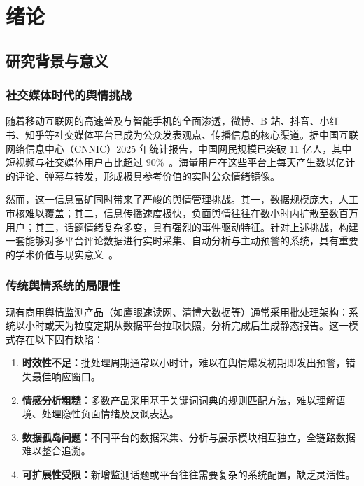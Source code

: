 
\chapter{绪论}

\section{研究背景与意义}

\subsection{社交媒体时代的舆情挑战}

随着移动互联网的高速普及与智能手机的全面渗透，微博、B 站、抖音、小红书、知乎等社交媒体平台已成为公众发表观点、传播信息的核心渠道。据中国互联网络信息中心（CNNIC）2025 年统计报告，中国网民规模已突破 11 亿人，其中短视频与社交媒体用户占比超过 90\%~\cite{cnnic2024}。海量用户在这些平台上每天产生数以亿计的评论、弹幕与转发，形成极具参考价值的实时公众情绪镜像。

然而，这一信息富矿同时带来了严峻的舆情管理挑战。其一，数据规模庞大，人工审核难以覆盖；其二，信息传播速度极快，负面舆情往往在数小时内扩散至数百万用户；其三，话题情绪复杂多变，具有强烈的事件驱动特征。针对上述挑战，构建一套能够对多平台评论数据进行实时采集、自动分析与主动预警的系统，具有重要的学术价值与现实意义~\cite{chen2023weibo}。

\subsection{传统舆情系统的局限性}

现有商用舆情监测产品（如鹰眼速读网、清博大数据等）通常采用批处理架构：系统以小时或天为粒度定期从数据平台拉取快照，分析完成后生成静态报告。这一模式存在以下固有缺陷：

\begin{enumerate}
  \item \textbf{时效性不足：}批处理周期通常以小时计，难以在舆情爆发初期即发出预警，错失最佳响应窗口。
  \item \textbf{情感分析粗糙：}多数产品采用基于关键词词典的规则匹配方法，难以理解语境、处理隐性负面情绪及反讽表达。
  \item \textbf{数据孤岛问题：}不同平台的数据采集、分析与展示模块相互独立，全链路数据难以整合追溯。
  \item \textbf{可扩展性受限：}新增监测话题或平台往往需要复杂的系统配置，缺乏灵活性。
\end{enumerate}

